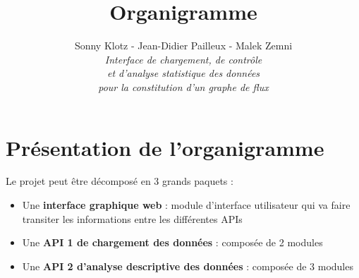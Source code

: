 
\geometry{top=3cm,bottom=3cm}
\usepackage{bbding}

\title{\vspace{\fill}\textbf{\Huge Organigramme}}
\author{Sonny Klotz - Jean-Didier Pailleux - Malek Zemni\vspace{2em}\\\textit{Interface de chargement, de contrôle}\\\textit{et d’analyse statistique des données}\\\textit{pour la constitution d’un graphe de flux}\vspace{2em}}


\clearpage
\maketitle\vspace{\fill}
\newpage\clearpage{}
	
	\section{Présentation de l'organigramme}
		Le projet peut être décomposé en 3 grands paquets :
		\begin{itemize}
		\item Une \textbf{interface graphique web} : module d'interface utilisateur qui va faire transiter les informations entre les différentes APIs
		\item Une \textbf{API 1 de chargement des données} : composée de 2 modules
		\item Une \textbf{API 2 d'analyse descriptive des données} : composée de 3 modules
		\end{itemize}
		
